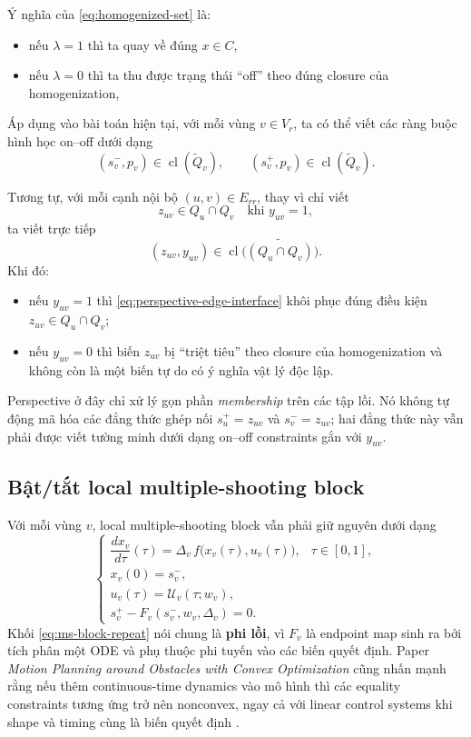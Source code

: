 \documentclass[12pt]{article}
\begin{document}
Ý nghĩa của \eqref{eq:homogenized-set} là:
\begin{itemize}
    \item nếu $\lambda=1$ thì ta quay về đúng $x\in C$,
    \item nếu $\lambda=0$ thì ta thu được trạng thái ``off'' theo đúng closure của homogenization,
\end{itemize}

Áp dụng vào bài toán hiện tại, với mỗi vùng $v\in V_r$, ta có thể viết các ràng buộc hình học on--off dưới dạng
\begin{equation}
(s_v^-,p_v)\in \operatorname{cl}(\widetilde{Q}_v),
\qquad
(s_v^+,p_v)\in \operatorname{cl}(\widetilde{Q}_v).
\label{eq:perspective-vertex-states}
\end{equation}

Tương tự, với mỗi cạnh nội bộ $(u,v)\in E_{rr}$, thay vì chỉ viết
\[
z_{uv}\in Q_u\cap Q_v
\quad\text{khi } y_{uv}=1,
\]
ta viết trực tiếp
\begin{equation}
(z_{uv},y_{uv})
\in
\operatorname{cl}\!\bigl(\widetilde{(Q_u\cap Q_v)}\bigr).
\label{eq:perspective-edge-interface}
\end{equation}
Khi đó:
\begin{itemize}
    \item nếu $y_{uv}=1$ thì \eqref{eq:perspective-edge-interface} khôi phục đúng điều kiện $z_{uv}\in Q_u\cap Q_v$;
    \item nếu $y_{uv}=0$ thì biến $z_{uv}$ bị ``triệt tiêu'' theo closure của homogenization và không còn là một biến tự do có ý nghĩa vật lý độc lập.
\end{itemize}

Perspective ở đây chỉ xử lý gọn phần \emph{membership} trên các tập lồi. Nó không tự động mã hóa các đẳng thức ghép nối $s_u^+=z_{uv}$ và $s_v^-=z_{uv}$; hai đẳng thức này vẫn phải được viết tường minh dưới dạng on--off constraints gắn với $y_{uv}$.

\subsection{Bật/tắt local multiple-shooting block}
Với mỗi vùng $v$, local multiple-shooting block vẫn phải giữ nguyên dưới dạng
\begin{equation}
\begin{cases}
\dfrac{d x_v}{d\tau}(\tau)=\Delta_v\,f\bigl(x_v(\tau),u_v(\tau)\bigr), & \tau\in[0,1],\\[4pt]
x_v(0)=s_v^-,\\
u_v(\tau)=\mathcal U_v(\tau;w_v),\\[2pt]
s_v^+ - F_v(s_v^-,w_v,\Delta_v)=0.
\end{cases}
\label{eq:ms-block-repeat}
\end{equation}
Khối \eqref{eq:ms-block-repeat} nói chung là \textbf{phi lồi}, vì $F_v$ là endpoint map sinh ra bởi tích phân một ODE và phụ thuộc phi tuyến vào các biến quyết định. Paper \emph{Motion Planning around Obstacles with Convex Optimization} cũng nhấn mạnh rằng nếu thêm continuous-time dynamics vào mô hình thì các equality constraints tương ứng trở nên nonconvex, ngay cả với linear control systems khi shape và timing cùng là biến quyết định \cite{marcucci2022}.
\end{document}
